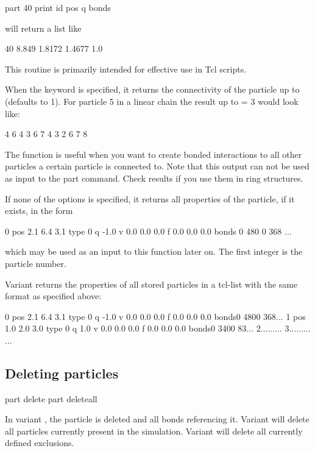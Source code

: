 \begin{code}
part 40 print id pos q bonds
\end{code}
will return a list like
\begin{tclcode}
40 8.849 1.8172 1.4677 1.0 {}
\end{tclcode}
This routine is primarily intended for effective use in Tcl scripts.

When the keyword  is specified, it returns the
connectivity of the particle up to  (defaults to 1). For
particle 5 in a linear chain the result up to  = 3 would
look like:
\begin{tclcode}
{ { 4 } { 6 } } { { 4 3 } { 6 7 } } { {4 3 2 } { 6 7 8 } } 
\end{tclcode}
The function is useful when you want to create bonded interactions to
all other particles a certain particle is connected to. Note that this
output can not be used as input to the part command. Check results if
you use them in ring structures.

If none of the options is specified, it returns all properties of the
particle, if it exists, in the form
\begin{tclcode}
  0 pos 2.1 6.4 3.1 type 0 q -1.0 v 0.0 0.0 0.0 f 0.0 0.0 0.0
  bonds { {0 480} {0 368} ... } 
\end{tclcode}
which may be used as an input to this function later on. The first
integer is the particle number.

Variant  returns the properties of all stored particles in
a tcl-list with the same format as specified above:
\begin{tclcode}
{0 pos 2.1 6.4 3.1 type 0 q -1.0 v 0.0 0.0 0.0 f 0.0 0.0 0.0
 bonds{{0 480}{0 368}...}} 
{1 pos 1.0 2.0 3.0 type 0 q 1.0 v 0.0 0.0 0.0 f 0.0 0.0 0.0
 bonds{{0 340}{0 83}...}} 
{2...{{...}...}}
{3...{{...}...}}
...
\end{tclcode}

\subsection{Deleting  particles}
\label{tcl:part:delete}

\begin{essyntax}
   part  delete
   part deleteall
\end{essyntax}

In variant , the particle  is deleted
and all bonds referencing it.  Variant  will delete all
particles currently present in the simulation. Variant 
will delete all currently defined exclusions.

